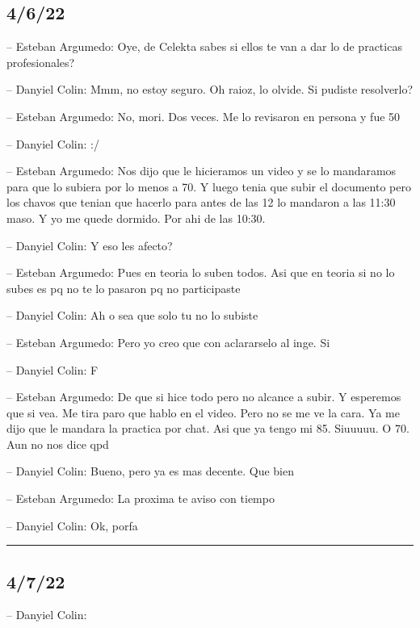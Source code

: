 \hypertarget{section-50}{%
\subsection{4/6/22}\label{section-50}}

-- Esteban Argumedo: Oye, de Celekta sabes si ellos te van a dar lo de
practicas profesionales?

-- Danyiel Colin: Mmm, no estoy seguro. Oh raioz, lo olvide. Si pudiste
resolverlo?

-- Esteban Argumedo: No, mori. Dos veces. Me lo revisaron en persona y
fue 50

-- Danyiel Colin: :/

-- Esteban Argumedo: Nos dijo que le hicieramos un video y se lo
mandaramos para que lo subiera por lo menos a 70. Y luego tenia que
subir el documento pero los chavos que tenian que hacerlo para antes de
las 12 lo mandaron a las 11:30 maso. Y yo me quede dormido. Por ahi de
las 10:30.

-- Danyiel Colin: Y eso les afecto?

-- Esteban Argumedo: Pues en teoria lo suben todos. Asi que en teoria si
no lo subes es pq no te lo pasaron pq no participaste

-- Danyiel Colin: Ah o sea que solo tu no lo subiste

-- Esteban Argumedo: Pero yo creo que con aclararselo al inge. Si

-- Danyiel Colin: F

-- Esteban Argumedo: De que si hice todo pero no alcance a subir. Y
esperemos que si vea. Me tira paro que hablo en el video. Pero no se me
ve la cara. Ya me dijo que le mandara la practica por chat. Asi que ya
tengo mi 85. Siuuuuu. O 70. Aun no nos dice qpd

-- Danyiel Colin: Bueno, pero ya es mas decente. Que bien

-- Esteban Argumedo: La proxima te aviso con tiempo

-- Danyiel Colin: Ok, porfa

\begin{center}\rule{0.5\linewidth}{0.5pt}\end{center}

\hypertarget{section-51}{%
\subsection{4/7/22}\label{section-51}}

-- Danyiel Colin:


